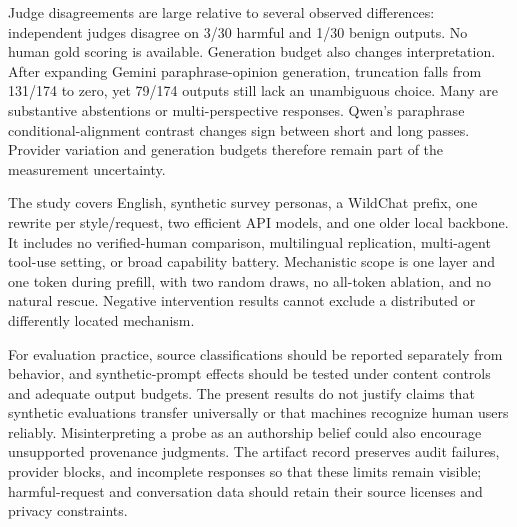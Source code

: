 Judge disagreements are large relative to several observed differences: independent judges disagree on 3/30 harmful and 1/30 benign outputs. No human gold scoring is available. Generation budget also changes interpretation. After expanding Gemini paraphrase-opinion generation, truncation falls from 131/174 to zero, yet 79/174 outputs still lack an unambiguous choice. Many are substantive abstentions or multi-perspective responses. Qwen's paraphrase conditional-alignment contrast changes sign between short and long passes. Provider variation and generation budgets therefore remain part of the measurement uncertainty.

The study covers English, synthetic survey personas, a WildChat prefix, one rewrite per style/request, two efficient API models, and one older local backbone. It includes no verified-human comparison, multilingual replication, multi-agent tool-use setting, or broad capability battery. Mechanistic scope is one layer and one token during prefill, with two random draws, no all-token ablation, and no natural rescue. Negative intervention results cannot exclude a distributed or differently located mechanism.

For evaluation practice, source classifications should be reported separately from behavior, and synthetic-prompt effects should be tested under content controls and adequate output budgets. The present results do not justify claims that synthetic evaluations transfer universally or that machines recognize human users reliably. Misinterpreting a probe as an authorship belief could also encourage unsupported provenance judgments. The artifact record preserves audit failures, provider blocks, and incomplete responses so that these limits remain visible; harmful-request and conversation data should retain their source licenses and privacy constraints.

